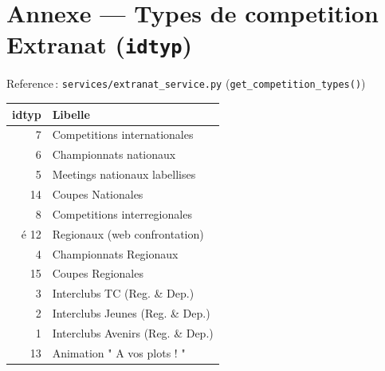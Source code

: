 \documentclass[11pt,a4paper]{article}
\begin{document}
\section{Annexe --- Types de competition Extranat (\texttt{idtyp})}

Reference\,: \texttt{services/extranat\_service.py} (\texttt{get\_competition\_types()})

\begin{longtable}{@{}rl@{}}
\toprule
\textbf{idtyp} & \textbf{Libelle} \\
\midrule
\endhead
7 & Competitions internationales \\
6 & Championnats nationaux \\
5 & Meetings nationaux labellises \\
14 & Coupes Nationales \\
8 & Competitions interregionales \\é
12 & Regionaux (web confrontation) \\
4 & Championnats Regionaux \\
15 & Coupes Regionales \\
3 & Interclubs TC (Reg. \& Dep.) \\
2 & Interclubs Jeunes (Reg. \& Dep.) \\
1 & Interclubs Avenirs (Reg. \& Dep.) \\
13 & Animation " A vos plots ! " \\
\bottomrule
\end{longtable}
\end{document}
